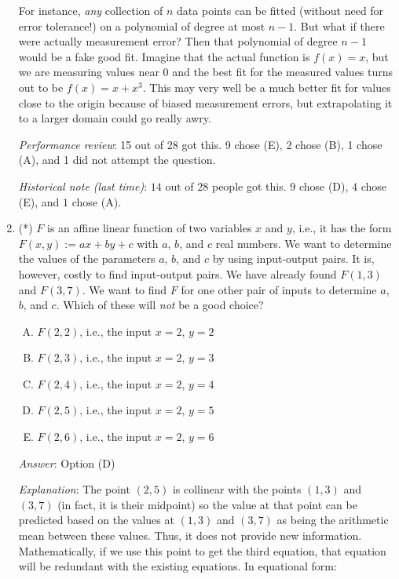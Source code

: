 \documentclass[10pt]{amsart}
\begin{document}
\begin{enumerate}
  For instance, {\em any} collection of $n$ data points can be fitted
  (without need for error tolerance!) on a polynomial of degree at
  most $n - 1$. But what if there were actually measurement error?
  Then that polynomial of degree $n - 1$ would be a fake good
  fit. Imagine that the actual function is $f(x) = x$, but we are
  measuring values near $0$ and the best fit for the measured values
  turns out to be $f(x) = x + x^3$. This may very well be a much
  better fit for values close to the origin because of biased
  measurement errors, but extrapolating it to a larger domain could go
  really awry.

  {\em Performance review}: 15 out of 28 got this. 9 chose (E), 2
  chose (B), 1 chose (A), and 1 did not attempt the question.

  {\em Historical note (last time)}: $14$ out of $28$ people got this. $9$
  chose (D), $4$ chose (E), and $1$ chose (A).

\item (*) $F$ is an affine linear function of two variables $x$ and
  $y$, i.e., it has the form $F(x,y) := ax + by + c$ with $a$, $b$,
  and $c$ real numbers. We want to determine the values of the
  parameters $a$, $b$, and $c$ by using input-output pairs. It is,
  however, costly to find input-output pairs. We have already found
  $F(1,3)$ and $F(3,7)$. We want to find $F$ for one other pair of
  inputs to determine $a$, $b$, and $c$. Which of these will {\em not}
  be a good choice?

  \begin{enumerate}[(A)]
  \item $F(2,2)$, i.e., the input $x = 2$, $y = 2$
  \item $F(2,3)$, i.e., the input $x = 2$, $y = 3$
  \item $F(2,4)$, i.e., the input $x = 2$, $y = 4$
  \item $F(2,5)$, i.e., the input $x = 2$, $y = 5$
  \item $F(2,6)$, i.e., the input $x = 2$, $y = 6$
  \end{enumerate}

  {\em Answer}: Option (D)

  {\em Explanation}: The point $(2,5)$ is collinear with the points
  $(1,3)$ and $(3,7)$ (in fact, it is their midpoint) so the value at
  that point can be predicted based on the values at $(1,3)$ and
  $(3,7)$ as being the arithmetic mean between these values. Thus, it
  does not provide new information. Mathematically, if we use this
  point to get the third equation, that equation will be redundant
  with the existing equations. In equational form:


\end{enumerate}
\end{document}
